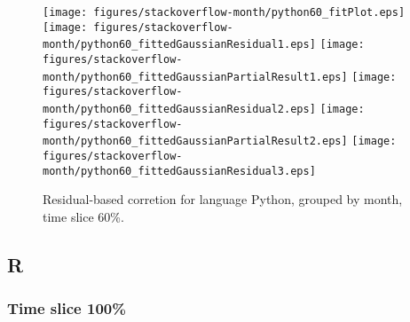 \begin{figure}[hb]
\centering
{}
{\texttt{[image: figures/stackoverflow-month/python60\_fitPlot.eps]}}
{\texttt{[image: figures/stackoverflow-month/python60\_fittedGaussianResidual1.eps]}}
{\texttt{[image: figures/stackoverflow-month/python60\_fittedGaussianPartialResult1.eps]}}
{\texttt{[image: figures/stackoverflow-month/python60\_fittedGaussianResidual2.eps]}}
{\texttt{[image: figures/stackoverflow-month/python60\_fittedGaussianPartialResult2.eps]}}
{\texttt{[image: figures/stackoverflow-month/python60\_fittedGaussianResidual3.eps]}}
\caption{Residual-based corretion for language Python, grouped by month, time slice 60\%.}
\end{figure}


\clearpage 
\newpage 


\subsection{R}

\FloatBarrier

\subsubsection{Time slice 100\%}

